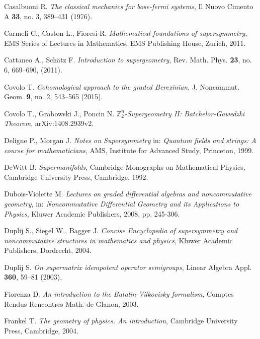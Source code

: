 \documentclass[11pt,a4paper]{report}
\theoremstyle{definition}
\begin{document}
\begin{thebibliography}{}
	Casalbuoni R. \textit{The classical mechanics for bose-fermi systems}, Il Nuovo Cimento A {\bf 33}, no. 3, 389--431 (1976).
						      					
	Carmeli C., Caston L., Fioresi R. \textit{Mathematical foundations of supersymmetry}, EMS Series of Lectures in Mathematics, EMS Publishing House, Zurich, 2011.
						      					
	Cattaneo A., Sch\"atz F. \textit{Introduction to supergeometry}, Rev. Math. Phys. {\bf 23}, no. 6, 669--690, (2011).
						      					
	Covolo T.
	{\it  Cohomological approach to the graded Berezinian}, J. Noncommut. Geom. {\bf 9}, no. 2, 543--565 (2015).
						      					
	Covolo T., Grabowski J., Poncin N. \textit{$\mathbb{Z}_2^n$-Supergeometry II: Batchelor-Gawedzki Theorem}, arXiv:1408.2939v2.
						      					
	Deligne P., Morgan J.
	{\it Notes on Supersymmetry} in: {\sl 
		Quantum fields and strings: A course for
	mathematicians},
	AMS, Institute for Advanced Study, Princeton,
	1999.
						      					
	DeWitt B. \textsl{Supermanifolds}, Cambridge Monographs on Mathematical Physics, Cambridge University Press, Cambridge, 1992. 
						      					
	Dubois-Violette M. {\it 
		Lectures on graded differential algebras and noncommutative geometry}, in: {\sl Noncommutative Differential Geometry and its Applications to Physics}, Kluwer Academic Publishers, 2008, pp. 245-306.
						      					
	Duplij S., Siegel W., Bagger J.
	{\sl Concise Encyclopedia of supersymmetry and noncommutative structures in mathematics and physics}, Kluwer Academic Publishers, Dordrecht, 2004.
						      					
	Duplij S. \textit{On supermatrix idempotent operator semigroups}, Linear Algebra  Appl. {\bf 360}, 59--81 (2003).
						      					
	Fiorenza D. \textit{An introduction to the Batalin-Vilkovisky formalism}, Comptes Rendus Rencontres Math. de Glanon, 2003.
						      					
	Frankel T. \textsl{The geometry of physics. An introduction}, Cambridge University Press, Cambridge, 2004.
						      					

\end{thebibliography}
\end{document}
